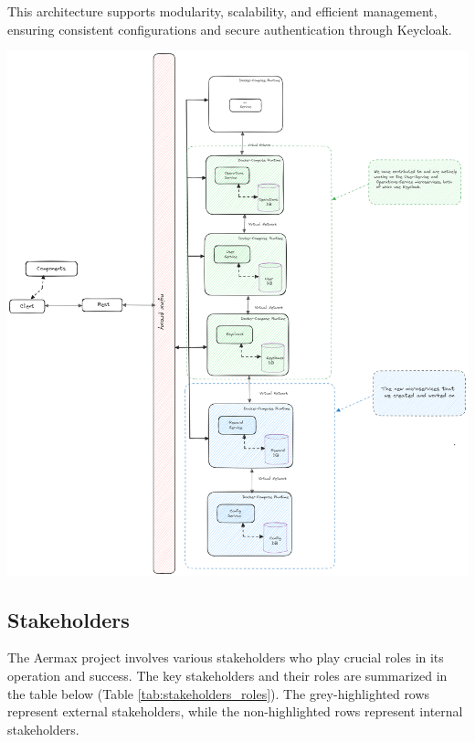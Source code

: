 This architecture supports modularity, scalability, and efficient management, ensuring consistent configurations and secure authentication through Keycloak.

\begin{minipage}{\linewidth}
    \centering
    \includegraphics[width=15.5cm]{src/assets/chapters/AermaxArchitecture.png}
\end{minipage}

\subsection{Stakeholders}
The Aermax project involves various stakeholders who play crucial roles in its operation and success. The key stakeholders and their roles are summarized in the table below (Table \ref{tab:stakeholders_roles}). The grey-highlighted rows represent external stakeholders, while the non-highlighted rows represent internal stakeholders.

